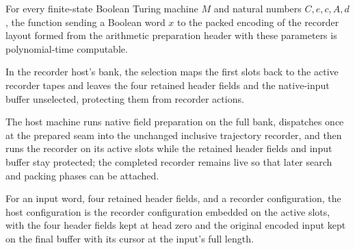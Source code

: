 \begin{lemma}
\label{Complexity.clRecordArgument_native}
\leanok
{}
For every finite-state Boolean Turing machine $M$ and natural numbers $C,e,c,A,d$, the
function sending a Boolean word $x$ to the packed encoding of the recorder layout formed
from the arithmetic preparation header with these parameters is polynomial-time
computable.
\end{lemma}

\begin{definition}
\label{Complexity.clRecordSelect}
\leanok
{}
In the recorder host's bank, the selection maps the first slots back to the active recorder tapes and leaves the four retained header fields and the native-input buffer unselected, protecting them from recorder actions.
\end{definition}

\begin{definition}
\label{Complexity.clRecordTM}
\leanok
{}
The host machine runs native field preparation on the full bank, dispatches once at the prepared seam into the unchanged inclusive trajectory recorder, and then runs the recorder on its active slots while the retained header fields and input buffer stay protected; the completed recorder remains live so that later search and packing phases can be attached.
\end{definition}

\begin{definition}
\label{Complexity.clRecordCfg}
\leanok
{}
For an input word, four retained header fields, and a recorder configuration, the host configuration is the recorder configuration embedded on the active slots, with the four header fields kept at head zero and the original encoded input kept on the final buffer with its cursor at the input's full length.
\end{definition}

